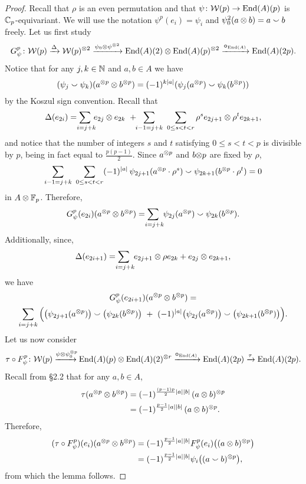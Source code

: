 \documentclass{amsart}
\begin{document}
\begin{enumerate}
	\begin{proof}
		Recall that $\rho$ is an even permutation and that $\psi \colon \mathcal{W}(p) \to \mathrm{End}(A)(p)$ is $\mathbb{C}_p$-equivariant.
		We will use the notation $\psi^p(e_i) = \psi_i$ and $\psi^2_0(a \otimes b) = a \smallsmile b$ freely.
		Let us first study
		\[
		G_\psi^p \colon \mathcal{W}(p) \xrightarrow{\Delta}
		\mathcal{W}(p)^{\otimes 2} \xrightarrow{\psi_0 \otimes \psi^{\otimes 2}}
		\mathrm{End}(A)(2) \otimes \mathrm{End}(A)(p)^{\otimes 2} \xrightarrow{\bm{\mathbin{\circ}}_{\mathrm{End}(A)}}
		\mathrm{End}(A)(2p).
		\]
		Notice that for any $j,k \in \mathbb{N}$ and $a,b \in A$ we have
		\[
		(\psi_j \smallsmile \psi_k)(a^{\otimes p} \otimes b^{\otimes p}) = (-1)^{k\lvert a\rvert}(\psi_j(a^{\otimes p}) \smallsmile \psi_k(b^{\otimes p}))
		\]
		by the Koszul sign convention.
		Recall that
		\[
		\Delta(e_{2i}) =
		\sum_{\mathclap{\ i=j+k}} \, e_{2j} \ot e_{2k} \ + \!\!
		\sum_{i-1=j+k} \ \sum_{0 \leq s<t<r} \rho^s e_{2j+1} \ot \rho^t e_{2k+1},
		\]
		and notice that the number of integers $s$ and $t$ satisfying $0 \leq s < t < p$ is divisible by $p$, being in fact equal to $\frac{p(p-1)}{2}$.
		Since $a^{\otimes p}$ and $b{\otimes p}$ are fixed by $\rho$,
		\[
		\sum_{i-1=j+k} \ \sum_{0 \leq s < t < r} (-1)^{\lvert a\rvert} \, \psi_{2j+1}(a^{\otimes p} \cdot \rho^s) \smallsmile \psi_{2k+1}(b^{\otimes p} \cdot \rho^t)
		= 0
		\]
		in $A \otimes {\mathbb{F}_p}$.
		Therefore,
		\[
		G_\psi^p(e_{2i})(a^{\ot p} \ot b^{\ot p}) =
		\sum_{\mathclap{\ i=j+k}} \ \psi_{2j}(a^{\ot p}) \smallsmile \psi_{2k}(b^{\ot p}).
		\]
		Additionally, since,
		\[
		\Delta(e_{2i+1}) =
		\sum_{\mathclap{\ i=j+k}} \ e_{2j+1} \ot \rho e_{2k} + e_{2j} \ot e_{2k+1},
		\]
		we have
		\begin{multline*}
			G_\psi^p(e_{2i+1})(a^{\otimes p} \otimes b^{\otimes p}) = \\
			\sum_{i=j+k} \Big(
			\big(\psi_{2j+1}(a^{\otimes p})\big) \smallsmile \big(\psi_{2k}(b^{\otimes p})\big)\ +\
			(-1)^{\lvert a\rvert}\big(\psi_{2j}(a^{\otimes p})\big) \smallsmile \big(\psi_{2k+1}(b^{\otimes p})\big)
			\Big).
		\end{multline*}
		Let us now consider
		\[
		\tau \mathbin{\circ} F_\psi^p \colon \mathcal{W}(p) \xrightarrow{\!\psi \otimes \psi_0^{\otimes p}\hspace*{-5pt}}
		\mathrm{End}(A)(p) \otimes \mathrm{End}(A)(2)^{\otimes r} \xrightarrow{\!\bm{\mathbin{\circ}}_{\mathrm{End}(A)}}
		\mathrm{End}(A)(2p) \xrightarrow{\tau} \mathrm{End}(A)(2p).
		\]
		Recall from \S2.2 that for any $a,b \in A$,
		\begin{align*}
			\tau(a^{\otimes p} \otimes b^{\otimes p}) &=
			(-1)^{\frac{(p-1)p}{2}\lvert a\rvert\lvert b\rvert} \, (a \otimes b)^{\otimes p} \\ &=
			(-1)^{\frac{p-1}{2}\lvert a\rvert\lvert b\rvert} \, (a \otimes b)^{\otimes p}.
		\end{align*}
		Therefore,
		\begin{align*}
			(\tau \mathbin{\circ} F_\psi^p)(e_i)(a^{\otimes p} \otimes b^{\otimes p}) &=
			(-1)^{\frac{p-1}{2}\lvert a\rvert\lvert b\rvert} F_\psi^p(e_i)\big((a \otimes b)^{\otimes p}\big) \\ &=
			(-1)^{\frac{p-1}{2}\lvert a\rvert\lvert b\rvert} \psi_{i}\big((a \smallsmile b)^{\otimes p}\big),
		\end{align*}
		from which the lemma follows.
	\end{proof}


\end{enumerate}
\end{document}
